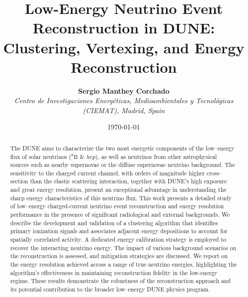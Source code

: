 \title{Low-Energy Neutrino Event Reconstruction in DUNE: Clustering, Vertexing, and Energy Reconstruction}

\newcommand{\ciemat}{\small \textit{Centro de Investigaciones Energéticas, Medioambientales y Tecnológicas (CIEMAT), Madrid, Spain}}

\author{\textbf{Sergio Manthey Corchado}\\
    \ciemat\\
}

\date{\today}
\maketitle
\begin{abstract}
    The \ac{DUNE} aims to characterize the two most energetic components of the low--energy flux of solar neutrinos ($^{8}\text{B}$ \& $hep$), as well as neutrinos from other astrophysical sources such as nearby supernovae or the diffuse supernovae neutrino background. The sensitivity to the charged current channel, with orders of magnitude higher cross--section than the elastic scattering interaction, together with DUNE's high exposure and great energy resolution, present an exceptional advantage in understanding the sharp energy characteristics of this neutrino flux. This work presents a detailed study of low--energy charged-current neutrino event reconstruction and energy resolution performance in the presence of significant radiological and external backgrounds. We describe the development and validation of a clustering algorithm that identifies primary ionization signals and associates adjacent energy depositions to account for spatially correlated activity. A dedicated energy calibration strategy is employed to recover the interacting neutrino energy. The impact of various background scenarios on the reconstruction is assessed, and mitigation strategies are discussed. We report on the energy resolution achieved across a range of true neutrino energies, highlighting the algorithm's effectiveness in maintaining reconstruction fidelity in the low-energy regime. These results demonstrate the robustness of the reconstruction approach and its potential contribution to the broader low--energy \ac{DUNE} physics program.
\end{abstract}
\newpage
\tableofcontents
\newpage